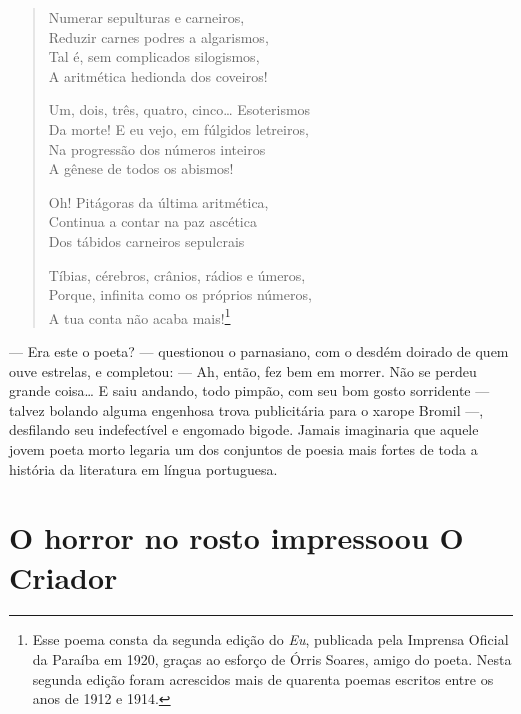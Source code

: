 \begin{verse}
Numerar sepulturas e carneiros,\\
Reduzir carnes podres a algarismos,\\
Tal é, sem complicados silogismos,\\
A aritmética hedionda dos coveiros!

Um, dois, três, quatro, cinco\ldots{} Esoterismos\\
Da morte! E eu vejo, em fúlgidos letreiros,\\
Na progressão dos números inteiros\\
A gênese de todos os abismos!

Oh! Pitágoras da última aritmética,\\
Continua a contar na paz ascética\\
Dos tábidos carneiros sepulcrais

Tíbias, cérebros, crânios, rádios e úmeros,\\
Porque, infinita como os próprios números,\\
A tua conta não acaba mais!\footnote{
Esse poema consta da segunda edição do \textit{Eu}, publicada pela
Imprensa Oficial da Paraíba em 1920, graças ao esforço de Órris
Soares, amigo do poeta. Nesta segunda edição foram acrescidos mais de
quarenta poemas escritos entre os anos de 1912 e 1914.}
\end{verse}

--- Era este o poeta? --- questionou o parnasiano, com o desdém doirado
de quem ouve estrelas, e completou: --- Ah, então, fez bem em morrer. Não
se perdeu grande coisa\ldots{} E saiu andando, todo pimpão, com seu bom
gosto sorridente --- talvez bolando alguma engenhosa trova publicitária
para o xarope Bromil ---, desfilando seu indefectível e engomado bigode.
Jamais imaginaria que aquele jovem poeta morto legaria um dos conjuntos
de poesia mais fortes de toda a história da literatura em língua
portuguesa. 


\section{O horror no rosto impresso\break ou O Criador}

